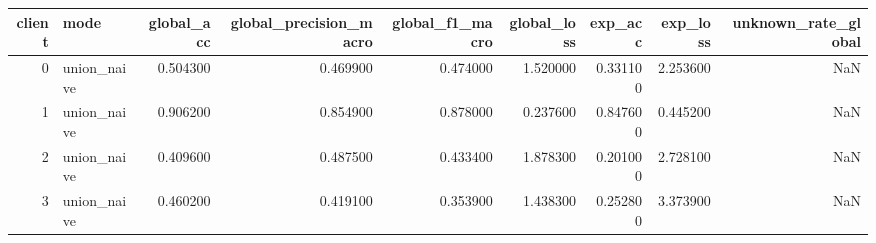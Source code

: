 \begin{tabular}{rlrrrrrrr}
\toprule
client & mode & global_acc & global_precision_macro & global_f1_macro & global_loss & exp_acc & exp_loss & unknown_rate_global \\
\midrule
0 & union_naive & 0.504300 & 0.469900 & 0.474000 & 1.520000 & 0.331100 & 2.253600 & NaN \\
1 & union_naive & 0.906200 & 0.854900 & 0.878000 & 0.237600 & 0.847600 & 0.445200 & NaN \\
2 & union_naive & 0.409600 & 0.487500 & 0.433400 & 1.878300 & 0.201000 & 2.728100 & NaN \\
3 & union_naive & 0.460200 & 0.419100 & 0.353900 & 1.438300 & 0.252800 & 3.373900 & NaN \\
\bottomrule
\end{tabular}
